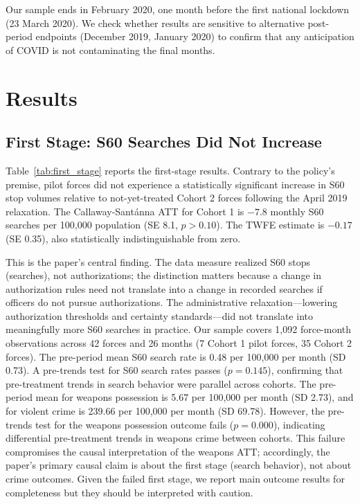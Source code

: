 \documentclass[12pt]{article}
\begin{document}
Our sample ends in February 2020, one month before the first national lockdown (23 March 2020). We check whether results are sensitive to alternative post-period endpoints (December 2019, January 2020) to confirm that any anticipation of COVID is not contaminating the final months.


\section{Results}
\label{sec:results}

\subsection{First Stage: S60 Searches Did Not Increase}

Table~\ref{tab:first_stage} reports the first-stage results. Contrary to the policy's premise, pilot forces did not experience a statistically significant increase in S60 stop volumes relative to not-yet-treated Cohort 2 forces following the April 2019 relaxation. The Callaway-Sant\'{a}nna ATT for Cohort 1 is $-7.8$ monthly S60 searches per 100,000 population (SE 8.1, $p > 0.10$). The TWFE estimate is $-0.17$ (SE 0.35), also statistically indistinguishable from zero.



This is the paper's central finding. The data measure realized S60 stops (searches), not authorizations; the distinction matters because a change in authorization rules need not translate into a change in recorded searches if officers do not pursue authorizations. The administrative relaxation---lowering authorization thresholds and certainty standards---did not translate into meaningfully more S60 searches in practice. Our sample covers 1,092 force-month observations across 42 forces and 26 months (7 Cohort 1 pilot forces, 35 Cohort 2 forces). The pre-period mean S60 search rate is 0.48 per 100,000 per month (SD 0.73). A pre-trends test for S60 search rates passes ($p = 0.145$), confirming that pre-treatment trends in search behavior were parallel across cohorts. The pre-period mean for weapons possession is 5.67 per 100,000 per month (SD 2.73), and for violent crime is 239.66 per 100,000 per month (SD 69.78). However, the pre-trends test for the weapons possession outcome fails ($p = 0.000$), indicating differential pre-treatment trends in weapons crime between cohorts. This failure compromises the causal interpretation of the weapons ATT; accordingly, the paper's primary causal claim is about the first stage (search behavior), not about crime outcomes. Given the failed first stage, we report main outcome results for completeness but they should be interpreted with caution.
\end{document}
